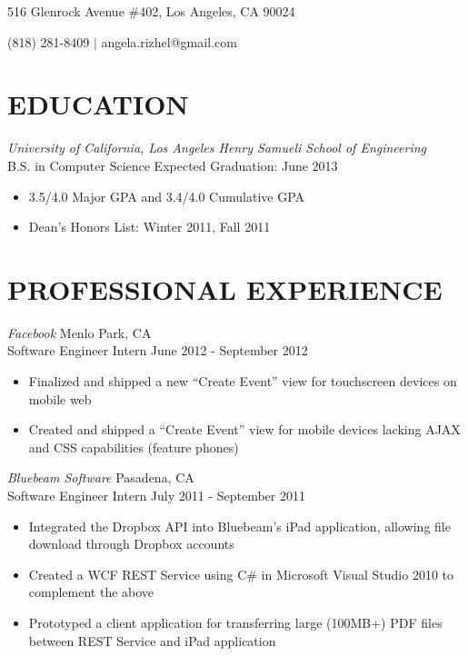 \documentclass{res}
\begin{document}

\begin{resume}
\centerline{516 Glenrock Avenue \#402, Los Angeles, CA 90024}
\centerline{(818) 281-8409 $|$ angela.rizhel@gmail.com }

\section{EDUCATION}
\vspace{8pt}
{\sl{University of California}, Los Angeles \hfill Henry Samueli School of Engineering} \\
B.S. in Computer Science \hfill Expected Graduation: June 2013

\begin{itemize} \itemsep -2pt %
  \item 3.5/4.0 Major GPA and 3.4/4.0 Cumulative GPA
  \item Dean's Honors List: Winter 2011, Fall 2011
\end{itemize} \vspace{-6pt}

\section{PROFESSIONAL EXPERIENCE}
\vspace{6pt}
  {\sl Facebook} \hfill Menlo Park, CA \\
  Software Engineer Intern \hfill June 2012 - September 2012

   \begin{itemize} \itemsep -2pt %
     \item Finalized and shipped a new ``Create Event'' view for touchscreen devices on mobile web
     \item Created and shipped a ``Create Event'' view for mobile devices lacking AJAX and CSS capabilities (feature phones)
   \end{itemize} \vspace{-6pt}

 {\sl Bluebeam Software} \hfill Pasadena, CA \\
 Software Engineer Intern \hfill July 2011 - September 2011

   \begin{itemize} \itemsep -2pt
   \item Integrated the Dropbox API into Bluebeam's iPad application, allowing file download through Dropbox accounts
   \item Created a WCF REST Service using C\# in Microsoft Visual Studio 2010 to complement the above
   \item Prototyped a client application for transferring large (100MB+) PDF files between  REST Service and iPad application
   \end{itemize} \vspace{-6pt}


\end{resume}
\end{document}
